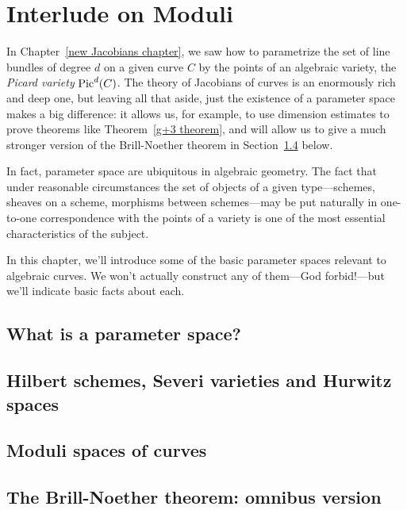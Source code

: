 

\chapter{Interlude on Moduli}
\label{Moduli chapter}

In Chapter~\ref{new Jacobians chapter}, we saw how to parametrize the set of line bundles of degree $d$ on a given curve $C$ by the points of an algebraic variety, the \emph{Picard variety} $\Pic^d(C)$. The theory of  Jacobians of curves is an enormously rich and deep one, but leaving all that aside, just the existence of a parameter space makes a big difference: it allows us, for example, to use dimension estimates to prove theorems like Theorem~\ref{g+3 theorem}, and will allow us to give a much stronger version of the Brill-Noether theorem in Section~\ref{BNomnibus} below.

In fact, parameter space are ubiquitous in algebraic geometry. The fact that under reasonable circumstances the set of objects of a given type---schemes, sheaves on a scheme, morphisms between schemes---may be put naturally in one-to-one correspondence with the points of a variety is one of the most essential characteristics of the subject.

In this chapter, we'll introduce some of the basic parameter spaces relevant to algebraic curves. We won't actually construct any of them---God forbid!---but we'll indicate basic facts about each.

\section{What is a parameter space?}

\section{Hilbert schemes, Severi varieties and Hurwitz spaces}

\section{Moduli spaces of curves}

\section{The Brill-Noether theorem: omnibus version}\label{BNomnibus}


